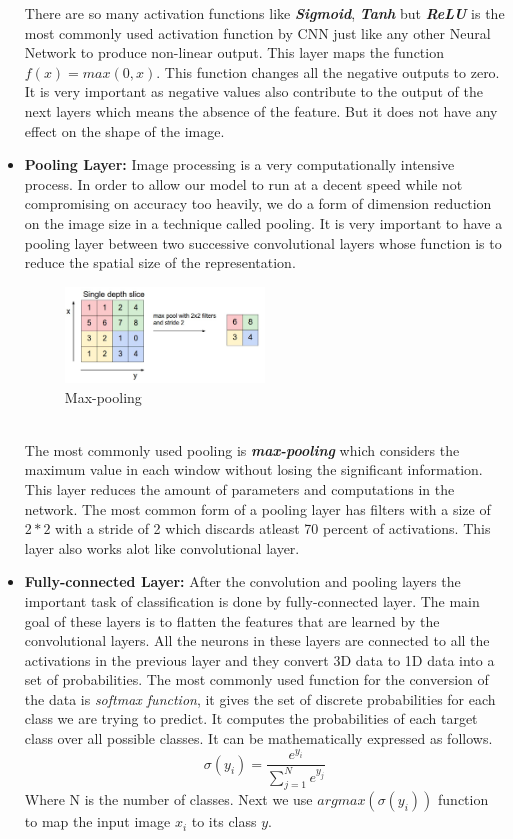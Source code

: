 \begin{itemize}
 
 \newpage\noindent There are so many activation functions like \textit{\textbf{Sigmoid}}, \textit{\textbf{Tanh}} but  \textbf{\textit{ReLU}} is the most commonly used activation function  by CNN just like any other Neural Network to produce non-linear output. This layer maps the function $f(x) = max(0,x) $. This function changes all the negative outputs to zero. It is very important as negative values also contribute to the output of the next layers which means the absence of the feature. But it does not have any effect on the shape of the image.\cite{8308186} 
 \item\textbf{Pooling Layer:} Image processing is a very computationally intensive process. In order to allow our model to run at a decent speed while not compromising on accuracy too heavily, we do a form of dimension reduction on the image size in a technique called pooling. It is very important to have a pooling layer between two successive convolutional layers whose function is to reduce the spatial size of the representation.\\
 \begin{figure}[h]
    \centering
    \includegraphics[width=0.5\textwidth]{thesis_template/images/maxpool.png}
    \caption{\small Max-pooling}
    \label{}
    \end{figure}\\
 The most commonly used pooling is \textbf{\textit{max-pooling}} which considers the maximum value in each window without losing the significant information. This layer reduces the amount of parameters and computations in the network. The most common form of a pooling layer has filters with a size of $2*2 $ with a stride of 2 which discards atleast 70 percent of activations. This layer also works alot like convolutional layer.

  
    
    \item \textbf{Fully-connected Layer:} After the convolution and pooling layers the important task of classification is done by fully-connected layer. The main goal of these layers is to flatten the features that are learned by the convolutional layers. All the neurons in these layers are connected to all the activations in the previous layer and they convert 3D data to 1D data into a set of probabilities. The most commonly used function for the conversion of the data is \textit{softmax function}, it gives the set of discrete probabilities for each class we are trying to predict. It computes the probabilities of each target class over all possible classes. It can be mathematically expressed as follows. 
    $$\sigma(y_i) = \frac{e^{y_i}}{\sum_{j=1}^{N} e^{y_j}}$$
     Where N is the number of classes. Next we use $argmax(\sigma (y_i))$ function to map the input image $x_i$ to its class $y$.\cite{8308186}
    \end{itemize}
